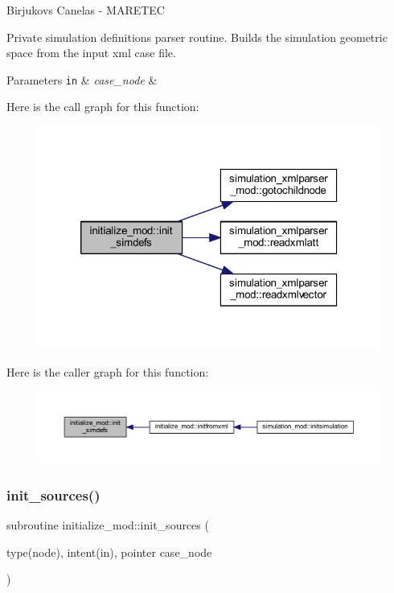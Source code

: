 Birjukovs Canelas -\/ M\+A\+R\+E\+T\+EC 

Private simulation definitions parser routine. Builds the simulation geometric space from the input xml case file. 
\begin{DoxyParams}[1]{Parameters}
\mbox{\tt in}  & {\em case\+\_\+node} & \\
\hline
\end{DoxyParams}
Here is the call graph for this function\+:
\nopagebreak
\begin{figure}[H]
\begin{center}
\leavevmode
\includegraphics[width=320pt]{namespaceinitialize__mod_a18736cca205403067232125b8e510ab2_cgraph}
\end{center}
\end{figure}
Here is the caller graph for this function\+:
\nopagebreak
\begin{figure}[H]
\begin{center}
\leavevmode
\includegraphics[width=350pt]{namespaceinitialize__mod_a18736cca205403067232125b8e510ab2_icgraph}
\end{center}
\end{figure}
\mbox{\label{namespaceinitialize__mod_aae6a35bca190cdf65a6146f254264cd1}} 
\subsubsection{\texorpdfstring{init\+\_\+sources()}{init\_sources()}}
{\footnotesize\ttfamily subroutine initialize\+\_\+mod\+::init\+\_\+sources (\begin{DoxyParamCaption}\item[{type(node), intent(in), pointer}]{case\+\_\+node }\end{DoxyParamCaption})\hspace{0.3cm}{\ttfamily [private]}}



